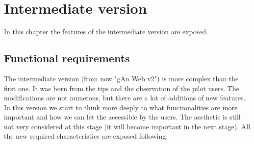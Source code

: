 
\chapter{Intermediate version} %

\label{Chapter5} %

In this chapter the features of the intermediate version are exposed.

\section{Functional requirements}

The intermediate version (from now "gAn Web v2") is more complex than the first one. It was born from the tips and the observation of the pilot users. The modifications are not numerous, but there are a lot of additions of new features. In this version we start to think more deeply to what functionalities are more important and how we can let the accessible by the users. The aesthetic is still not very considered at this stage (it will become important in the next stage). 
All the new required characteristics are exposed following:

